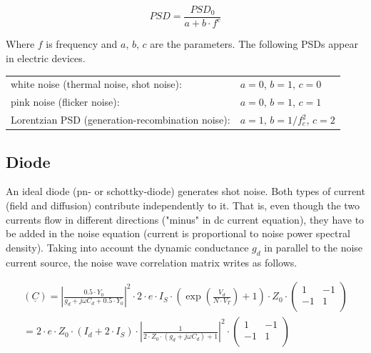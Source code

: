 \documentclass[10pt]{report}
\begin{document}
\begin{equation}
PSD = \frac{PSD_0}{a+b\cdot f^c}
\end{equation}

Where $f$ is frequency and $a$, $b$, $c$ are the parameters.  The
following PSDs appear in electric devices.

\addvspace{12pt}

\begin{tabular}{ll}
white noise (thermal noise, shot noise):         & $a=0$, $b=1$, $c=0$ \\
pink noise (flicker noise):                      & $a=0$, $b=1$, $c=1$ \\
Lorentzian PSD (generation-recombination noise): & $a=1$, $b=1/f_c^2$, $c=2$ \\
\end{tabular}


\subsection{Diode}

An ideal diode (pn- or schottky-diode) generates shot noise.  Both
types of current (field and diffusion) contribute independently to it.
That is, even though the two currents flow in different directions
("minus" in dc current equation), they have to be added in the noise
equation (current is proportional to noise power spectral density).
Taking into account the dynamic conductance $g_d$ in parallel to the
noise current source, the noise wave correlation matrix writes as
follows.

\begin{equation}
\begin{split}
(\underline{C})
 =  \left| \frac{0.5\cdot Y_0}{g_d+j\omega C_d + 0.5\cdot Y_0}\right|^2  \cdot 2\cdot e\cdot I_S\cdot
    \left( \exp\left( \frac{V_{d}}{N\cdot V_T} \right) +1 \right) \cdot Z_0\cdot\begin{pmatrix}
   1 & -1\\
  -1 &  1\\
\end{pmatrix} \\
 = 2\cdot e\cdot Z_0\cdot \left(I_{d} + 2\cdot I_{S}\right)\cdot
    \left| \frac{1}{2\cdot Z_0\cdot (g_d+j\omega C_d) + 1}\right|^2 \cdot
\begin{pmatrix}
   1 & -1\\
  -1 &  1\\
\end{pmatrix}
\end{split}
\end{equation}
\end{document}
